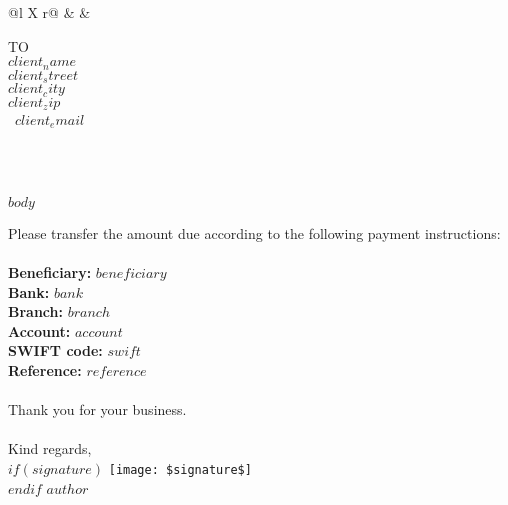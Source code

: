 \documentclass[
  11pt,
  a4paper,
  UKenglish,
  $for(classoption)$
    $classoption$$sep$,
  $endfor$
]{$documentclass$}
\begin{document}
\begin{table}[t]
\begin{tabularx}{\textwidth}{@{}l X r@{}}
  \hspace{-1em}  &
  \hfill &
  \\
\end{tabularx}
\end{table}

\vspace*{4.5em}

\small{\uppercase{To}}\\
\small{\textbf{$client_name$}}\\
\small{$client_street$}\\
\small{$client_city$}\\
\small{$client_zip$}\\
\small{\faEnvelopeO\ $client_email$}

\vspace*{1em}

{\centering\large
\textbf{}\\
\textit{}\\}

$body$

{\small
Please transfer the amount due according to the following payment instructions:\\
\\
\textbf{Beneficiary: } $beneficiary$\\
\textbf{Bank:} $bank$\\
\textbf{Branch:} $branch$\\
\textbf{Account:} $account$\\
\textbf{SWIFT code:} $swift$\\
\textbf{Reference:} $reference$}\\
\\
Thank you for your business.\\
\\
Kind regards,\\
$if(signature)$
\texttt{[image: \$signature\$]}\\
$endif$
$author$
\end{document}
